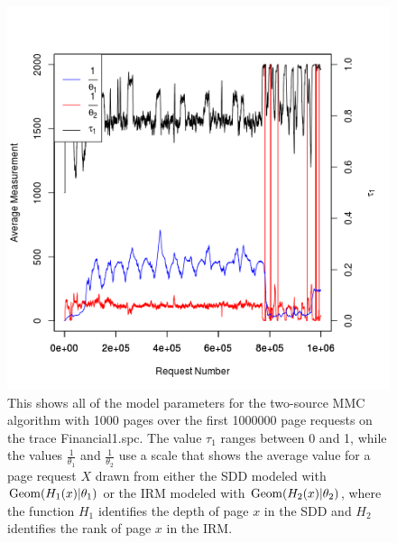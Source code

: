   \begin{figure}
  \centering
  \includegraphics[width=6in]{../media/tau_and_theta_1000_1000_4000_2.png}
  \caption[$\tau_1$, $\frac{1}{\theta_1}$, and $\frac{1}{\theta_2}$ for 1000
  page MMC cache on trace Financial1.spc]
  {This shows all of the model parameters for the two-source MMC
  algorithm with 1000 pages over the first 1000000 page requests on the trace
  Financial1.spc. The value $\tau_1$ ranges between 0 and 1, while the values
  $\frac{1}{\theta_1}$ and $\frac{1}{\theta_2}$ use a scale that shows the
  average value for a page request $X$ drawn from either the SDD modeled with
  $\operatorname*{\operatorname{Geom}}(H_1(x)|\theta_1)$ or the IRM modeled with $\operatorname*{\operatorname{Geom}}(H_2(x)|\theta_2)$,
  where the function $H_1$ identifies the depth of page $x$ in the SDD and $H_2$
  identifies the rank of page $x$ in the IRM.}
  \label{fig:tau_and_theta_1000_financial1}
  \end{figure}

